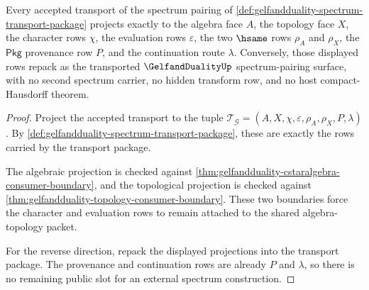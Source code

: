 \begin{theorem}
\label{thm:gelfandduality-spectrum-transport-exactness}
Every accepted transport of the spectrum pairing of
\autoref{def:gelfandduality-spectrum-transport-package} projects exactly to the
algebra face $A$, the topology face $X$, the character rows $\chi$, the
evaluation rows $\varepsilon$, the two $\hsame$ rows $\rho_{A}$ and
$\rho_{X}$, the $\mathsf{Pkg}$ provenance row $P$, and the continuation route
$\lambda$. Conversely, those displayed rows repack as the transported
$\GelfandDualityUp$ spectrum-pairing surface, with no second spectrum carrier,
no hidden transform row, and no host compact-Hausdorff theorem.
\end{theorem}
\begin{proof}
Project the accepted transport to the tuple
$\mathcal{T}_{\mathcal{G}}=(A,X,\chi,\varepsilon,\rho_{A},\rho_{X},P,\lambda)$.
By \autoref{def:gelfandduality-spectrum-transport-package}, these are exactly
the rows carried by the transport package.

The algebraic projection is checked against
\autoref{thm:gelfandduality-cstaralgebra-consumer-boundary}, and the
topological projection is checked against
\autoref{thm:gelfandduality-topology-consumer-boundary}. These two boundaries
force the character and evaluation rows to remain attached to the shared
algebra-topology packet.

For the reverse direction, repack the displayed projections into the transport
package. The provenance and continuation rows are already $P$ and $\lambda$,
so there is no remaining public slot for an external spectrum construction.
\end{proof}

